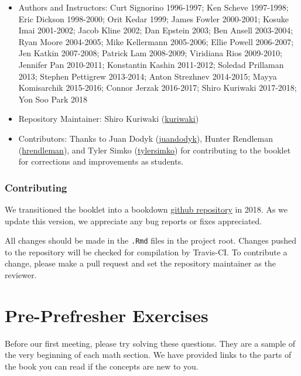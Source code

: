 \documentclass[
]{book}
\providecommand{\tightlist}{%
  \setlength{\itemsep}{0pt}\setlength{\parskip}{0pt}}
\theoremstyle{definition}
\theoremstyle{definition}
\theoremstyle{definition}
\theoremstyle{remark}
\begin{document}
\begin{itemize}
\tightlist
\item
  Authors and Instructors: Curt Signorino 1996-1997; Ken Scheve 1997-1998; Eric Dickson 1998-2000; Orit Kedar 1999; James Fowler 2000-2001; Kosuke Imai 2001-2002; Jacob Kline 2002; Dan Epstein 2003; Ben Ansell 2003-2004; Ryan Moore 2004-2005; Mike Kellermann 2005-2006; Ellie Powell 2006-2007; Jen Katkin 2007-2008; Patrick Lam 2008-2009; Viridiana Rios 2009-2010; Jennifer Pan 2010-2011; Konstantin Kashin 2011-2012; Soledad Prillaman 2013; Stephen Pettigrew 2013-2014; Anton Strezhnev 2014-2015; Mayya Komisarchik 2015-2016; Connor Jerzak 2016-2017; Shiro Kuriwaki 2017-2018; Yon Soo Park 2018
\item
  Repository Maintainer: Shiro Kuriwaki (\href{https://github.com/kuriwaki}{kuriwaki})
\item
  Contributors: Thanks to Juan Dodyk (\href{https://github.com/juandodyk}{juandodyk}), Hunter Rendleman (\href{https://github.com/hrendleman}{hrendleman}), and Tyler Simko (\href{https://github.com/tylersimko}{tylersimko}) for contributing to the booklet for corrections and improvements as students.
\end{itemize}

\hypertarget{contributing}{%
\subsection*{Contributing}\label{contributing}}

We transitioned the booklet into a bookdown \href{https://github.com/IQSS/prefresher}{github repository} in 2018. As we update this version, we appreciate any bug reports or fixes appreciated.

All changes should be made in the \texttt{.Rmd} files in the project root. Changes pushed to the repository will be checked for compilation by Travis-CI. To contribute a change, please make a pull request and set the repository maintainer as the reviewer.

\hypertarget{pre-prefresher-exercises}{%
\chapter*{Pre-Prefresher Exercises}\label{pre-prefresher-exercises}}

Before our first meeting, please try solving these questions. They are a sample of the very beginning of each math section. We have provided links to the parts of the book you can read if the concepts are new to you.
\end{document}

